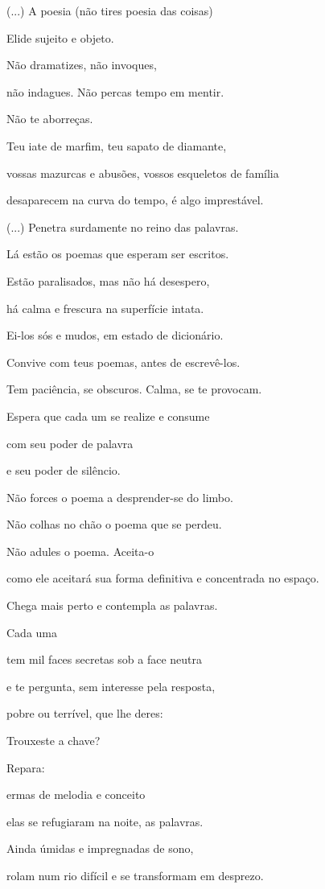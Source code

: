 (...) A poesia (não tires poesia das coisas)

Elide sujeito e objeto.

Não dramatizes, não invoques,

não indagues. Não percas tempo em mentir.

Não te aborreças.

Teu iate de marfim, teu sapato de diamante,

vossas mazurcas e abusões, vossos esqueletos de família

desaparecem na curva do tempo, é algo imprestável.

(...) Penetra surdamente no reino das palavras.

Lá estão os poemas que esperam ser escritos.

Estão paralisados, mas não há desespero,

há calma e frescura na superfície intata.

Ei-los sós e mudos, em estado de dicionário.

Convive com teus poemas, antes de escrevê-los.

Tem paciência, se obscuros. Calma, se te provocam.

Espera que cada um se realize e consume

com seu poder de palavra

e seu poder de silêncio.

Não forces o poema a desprender-se do limbo.

Não colhas no chão o poema que se perdeu.

Não adules o poema. Aceita-o

como ele aceitará sua forma definitiva e concentrada no espaço.

Chega mais perto e contempla as palavras.

Cada uma

tem mil faces secretas sob a face neutra

e te pergunta, sem interesse pela resposta,

pobre ou terrível, que lhe deres:

Trouxeste a chave?

Repara:

ermas de melodia e conceito

elas se refugiaram na noite, as palavras.

Ainda úmidas e impregnadas de sono,

rolam num rio difícil e se transformam em desprezo.

